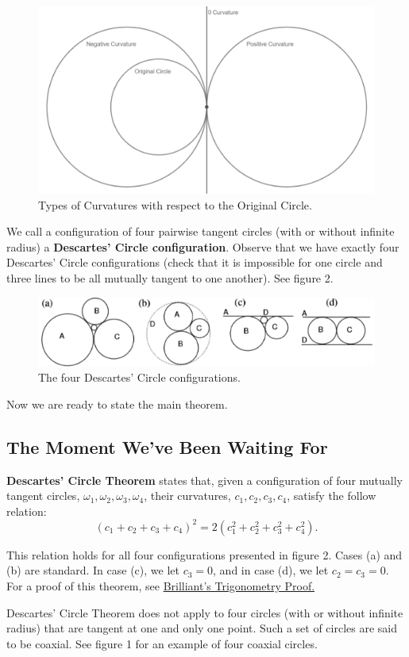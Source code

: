 \documentclass{article}
\begin{document}
\begin{figure}[ht]
\centering
\includegraphics[width=.5\textwidth]{Figure 1 - Types of Curvatures.png}
\caption{Types of Curvatures with respect to the Original Circle.}
\end{figure}

We call a configuration of four pairwise tangent circles (with or without infinite radius) a \textbf{Descartes' Circle configuration}. Observe that we have exactly four Descartes' Circle configurations (check that it is impossible for one circle and three lines to be all mutually tangent to one another). See figure 2. 

\begin{figure}[ht]
\centering
\includegraphics[width=.5\textwidth]{Figure 2 - Descartes' Circle Configs Bigger Still.png}
\caption{The four Descartes' Circle configurations.}
\end{figure}

Now we are ready to state the main theorem.

\subsection{The Moment We've Been Waiting For}
\textbf{Descartes' Circle Theorem} states that, given a configuration of four mutually tangent circles, $\omega_1,\omega_2,\omega_3,\omega_4$, their curvatures, $c_1,c_2,c_3,c_4$, satisfy the follow relation: $$(c_1+c_2+c_3+c_4)^2=2(c_1^2+c_2^2+c_3^2+c_4^2).$$

This relation holds for all four configurations presented in figure 2. Cases (a) and (b) are standard. In case (c), we let $c_3=0$, and in case (d), we let $c_2=c_3=0$. For a proof of this theorem, see \href{https://brilliant.org/wiki/descartes-theorem/}{Brilliant's Trigonometry Proof.}

Descartes' Circle Theorem does not apply to four circles (with or without infinite radius) that are tangent at one and only one point. Such a set of circles are said to be coaxial. See figure 1 for an example of four coaxial circles.
\end{document}
